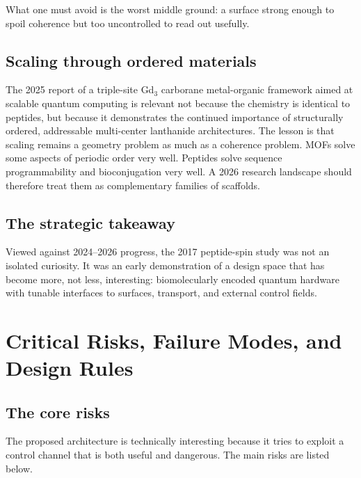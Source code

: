 \documentclass[11pt]{report}
\theoremstyle{definition}
\begin{document}
What one must avoid is the worst middle ground: a surface strong enough to spoil coherence but too uncontrolled to read out usefully.

\section{Scaling through ordered materials}
The 2025 report of a triple-site Gd$_3$ carborane metal-organic framework aimed at scalable quantum computing is relevant not because the chemistry is identical to peptides, but because it demonstrates the continued importance of structurally ordered, addressable multi-center lanthanide architectures. The lesson is that scaling remains a geometry problem as much as a coherence problem. MOFs solve some aspects of periodic order very well. Peptides solve sequence programmability and bioconjugation very well. A 2026 research landscape should therefore treat them as complementary families of scaffolds.

\section{The strategic takeaway}
Viewed against 2024--2026 progress, the 2017 peptide-spin study was not an isolated curiosity. It was an early demonstration of a design space that has become more, not less, interesting: biomolecularly encoded quantum hardware with tunable interfaces to surfaces, transport, and external control fields.

\chapter{Critical Risks, Failure Modes, and Design Rules}

\section{The core risks}
The proposed architecture is technically interesting because it tries to exploit a control channel that is both useful and dangerous. The main risks are listed below.
\end{document}
